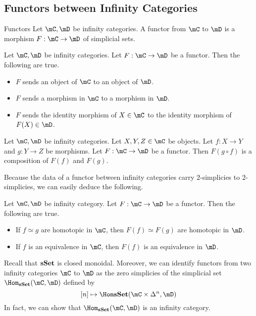 \documentclass[a4paper]{article}
\begin{document}
\subsection{Functors between Infinity Categories}
\begin{defn}{Functors}{} Let $\mC,\mD$ be infinity categories. A functor from $\mC$ to $\mD$ is a morphism $F:\mC\to\mD$ of simplicial sets. 
\end{defn}

\begin{lmm}{}{} Let $\mC,\mD$ be infinity categories. Let $F:\mC\to\mD$ be a functor. Then the following are true. 
\begin{itemize}
\item $F$ sends an object of $\mC$ to an object of $\mD$. 
\item $F$ sends a morphism in $\mC$ to a morphism in $\mD$. 
\item $F$ sends the identity morphism of $X\in\mC$ to the identity morphism of $F(X)\in\mD$. 
\end{itemize}
\end{lmm}

\begin{lmm}{}{} Let $\mC,\mD$ be infinity categories. Let $X,Y,Z\in\mC$ be objects. Let $f:X\to Y$ and $g:Y\to Z$ be morphisms. Let $F:\mC\to\mD$ be a functor. Then $F(g\circ f)$ is a composition of $F(f)$ and $F(g)$. 
\end{lmm}

Because the data of a functor between infinity categories carry $2$-simplicies to $2$-simplicies, we can easily deduce the following. 

\begin{lmm}{}{} Let $\mC,\mD$ be infinity category. Let $F:\mC\to\mD$ be a functor. Then the following are true. 
\begin{itemize}
\item If $f\simeq g$ are homotopic in $\mC$, then $F(f)\simeq F(g)$ are homotopic in $\mD$. 
\item If $f$ is an equivalence in $\mC$, then $F(f)$ is an equivalence in $\mD$. 
\end{itemize}
\end{lmm}

Recall that $\bold{sSet}$ is closed monoidal. Moreover, we can identify functors from two infinity categories $\mC$ to $\mD$ as the zero simplicies of the simplicial set $\Hom_\bold{sSet}(\mC,\mD)$ defined by $$[n]\mapsto\Hom\bold{sSet}(\mC\times\Delta^n,\mD)$$ In fact, we can show that $\Hom_\bold{sSet}(\mC,\mD)$ is an infinity category. 
\end{document}
